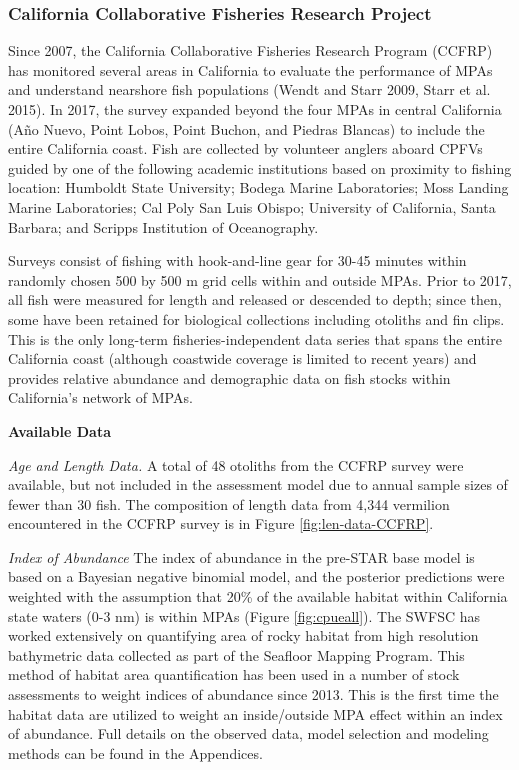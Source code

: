 \documentclass[
  english,
  a4paper,
]{article}
\begin{document}
\hypertarget{california-collaborative-fisheries-research-project}{%
\subsubsection{California Collaborative Fisheries Research Project}\label{california-collaborative-fisheries-research-project}}

Since 2007, the California Collaborative Fisheries Research Program (CCFRP)
has monitored several areas in California to
evaluate the performance of MPAs and understand nearshore fish populations
(Wendt and Starr 2009, Starr et al. 2015). In 2017, the survey expanded beyond the four
MPAs in central California
(Año Nuevo, Point Lobos, Point Buchon, and Piedras Blancas)
to include the entire California coast.
Fish are collected by volunteer anglers aboard CPFVs guided by one of
the following academic institutions based on proximity to fishing location:
Humboldt State University;
Bodega Marine Laboratories;
Moss Landing Marine Laboratories;
Cal Poly San Luis Obispo;
University of California, Santa Barbara; and
Scripps Institution of Oceanography.

Surveys consist of fishing with hook-and-line gear for 30-45 minutes within
randomly chosen 500 by 500 m grid cells within and outside MPAs.
Prior to 2017, all fish were measured for length and released or descended to depth;
since then, some have been retained for biological collections including otoliths
and fin clips. This is the only long-term fisheries-independent data series that
spans the entire California coast (although coastwide coverage is limited to
recent years) and provides relative abundance and demographic data on fish
stocks within California's network of MPAs.

\textbf{Available Data}

\emph{Age and Length Data.} A total of 48 otoliths from the CCFRP survey were available,
but not included in the assessment model due to annual sample sizes of fewer than
30 fish. The composition of length data from 4,344 vermilion encountered
in the CCFRP survey is in Figure \ref{fig:len-data-CCFRP}.

\emph{Index of Abundance}
The index of abundance in the pre-STAR base model is based on a Bayesian negative
binomial model, and the posterior predictions were weighted with the assumption
that 20\% of the available habitat within California state waters (0-3 nm) is
within MPAs (Figure \ref{fig:cpueall}). The SWFSC has worked extensively on
quantifying area of rocky habitat from high resolution bathymetric data collected
as part of the Seafloor Mapping Program. This method of habitat area quantification
has been used in a number of stock assessments to weight indices of abundance
since 2013. This is the first time the habitat data are utilized to weight an
inside/outside MPA effect within an index of abundance. Full details on the
observed data, model selection and modeling methods can be found in the Appendices.
\end{document}
